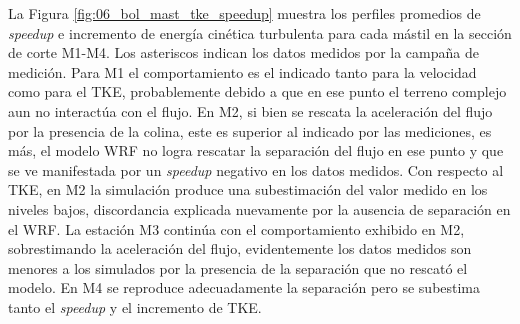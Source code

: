 La Figura \ref{fig:06_bol_mast_tke_speedup} muestra los perfiles promedios de \emph{speedup} e incremento de energía cinética turbulenta para cada mástil en la sección de corte M1-M4. Los asteriscos indican los datos medidos por la campaña de medición. Para M1 el comportamiento es el indicado tanto para la velocidad como para el TKE, probablemente debido a que en ese punto el terreno complejo aun no interactúa con el flujo. En M2, si bien se rescata la aceleración del flujo por la presencia de la colina, este es superior al indicado por las mediciones, es más, el modelo WRF no logra rescatar la separación del flujo en ese punto y que se ve manifestada por un \emph{speedup} negativo en los datos medidos. Con respecto al TKE, en M2 la simulación produce una subestimación del valor medido en los niveles bajos, discordancia explicada nuevamente por la ausencia de separación en el WRF. La estación M3 continúa con el comportamiento exhibido en M2, sobrestimando la aceleración del flujo, evidentemente los datos medidos son menores a los simulados por la presencia de la separación que no rescató el modelo. En M4 se reproduce adecuadamente la separación pero se subestima tanto el \emph{speedup} y el incremento de TKE.

